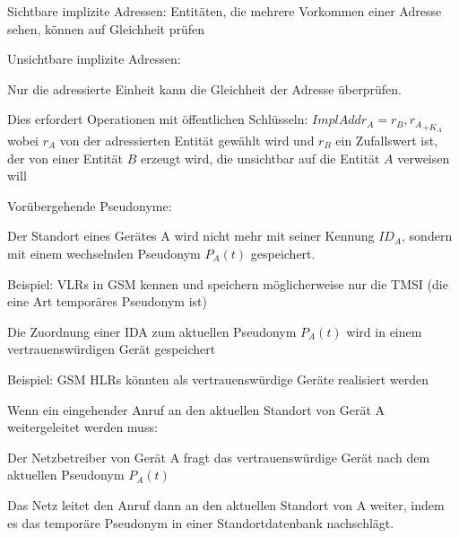 \documentclass[a4paper]{article}
\begin{document}
\begin{multicols}{3}
\begin{itemize*}
\begin{itemize*}
\begin{itemize*}
                        \item Sichtbare implizite Adressen: Entitäten, die mehrere Vorkommen einer Adresse sehen, können auf Gleichheit prüfen
                  \end{itemize*}
                  \item Unsichtbare implizite Adressen:
                  \begin{itemize*}
                        \item Nur die adressierte Einheit kann die Gleichheit der Adresse überprüfen.
                        \item Dies erfordert Operationen mit öffentlichen Schlüsseln: $ImplAddr_A ={r_B, r_A}_{+K_A}$ wobei $r_A$ von der adressierten Entität gewählt wird und $r_B$ ein Zufallswert ist, der von einer Entität $B$ erzeugt wird, die unsichtbar auf die Entität $A$ verweisen will
                  \end{itemize*}
            \end{itemize*}
            \item Vorübergehende Pseudonyme:
            \begin{itemize*}
                  \item Der Standort eines Gerätes A wird nicht mehr mit seiner Kennung $ID_A$, sondern mit einem wechselnden Pseudonym $P_A(t)$ gespeichert.
                  \begin{itemize*}
                        \item Beispiel: VLRs in GSM kennen und speichern möglicherweise nur die TMSI (die eine Art temporäres Pseudonym ist)
                  \end{itemize*}
                  \item Die Zuordnung einer IDA zum aktuellen Pseudonym $P_A(t)$ wird in einem vertrauenswürdigen Gerät gespeichert
                  \begin{itemize*}
                        \item Beispiel: GSM HLRs könnten als vertrauenswürdige Geräte realisiert werden
                  \end{itemize*}
                  \item Wenn ein eingehender Anruf an den aktuellen Standort von Gerät A weitergeleitet werden muss:
                  \begin{itemize*}
                        \item Der Netzbetreiber von Gerät A fragt das vertrauenswürdige Gerät nach dem aktuellen Pseudonym $P_A(t)$
                        \item Das Netz leitet den Anruf dann an den aktuellen Standort von A weiter, indem es das temporäre Pseudonym in einer Standortdatenbank nachschlägt.

\end{itemize*}
\end{itemize*}
\end{itemize*}
\end{multicols}
\end{document}

